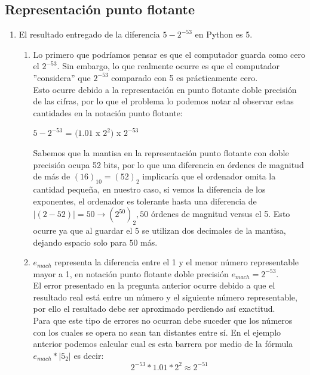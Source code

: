 \documentclass[spanish, fleqn]{article}
\begin{document}
	\subsection{Representación punto flotante}
	\begin{enumerate}
		\item
			El resultado entregado de la diferencia $5-2^{-53}$ en Python es 5.
		\begin{enumerate}
			\item
				Lo primero que podríamos pensar es que el computador guarda como
				cero el $2^{-53}$. Sin embargo, lo que realmente ocurre es que
				el computador ''considera'' que $2^{-53}$ comparado con 5 es 
				prácticamente cero.\\
				Esto ocurre debido a la representación en punto flotante doble
				precisión de las cifras, por lo que el problema lo podemos
				notar al observar estas cantidades en la notación punto
				flotante:
				\begin{center}
					$5-2^{-53}$ = $(1.01$ x $2^{2} )$ x $2^{-53}$
				\end{center}
				Sabemos que la mantisa en la representación punto flotante con
				doble precisión ocupa 52 bits, por lo que una diferencia en
				órdenes de magnitud de más de $(16)_{10} = (52)_{2}$ implicaría
				que el ordenador omita la cantidad pequeña, en nuestro caso, si
				vemos la diferencia de los exponentes, el ordenador es tolerante
				hasta una diferencia de 
				$|(2 - 52)| = 50 \rightarrow (2^{50})_{2}, 50$ órdenes de
				magnitud versus el 5. Esto ocurre ya que al guardar el $5$ se 
				utilizan dos decimales de la mantisa, dejando espacio solo para
				$50$ más.
			\item
				$e_{mach}$ representa la diferencia entre el 1 y el menor número
				representable mayor a 1, en notación punto flotante doble
				precisión $e_{mach} = 2^{-53}$.\\
				El error presentado en la pregunta anterior ocurre debido a que
				el resultado real está entre un número y el	siguiente número
				representable, por ello el resultado debe ser aproximado 
				perdiendo así exactitud.\\
				Para que este tipo de errores no ocurran debe suceder que los
				números con los cuales se opera no sean tan distantes entre sí.
				En el ejemplo anterior podemos calcular cual es esta barrera por
				medio de la fórmula $e_{mach} * |5_2|$ es decir:
				\begin{equation*}
					2^{-53} * 1.01 * 2^2 \approx 2^{-51}
				\end{equation*}

\end{enumerate}
\end{enumerate}
\end{document}
